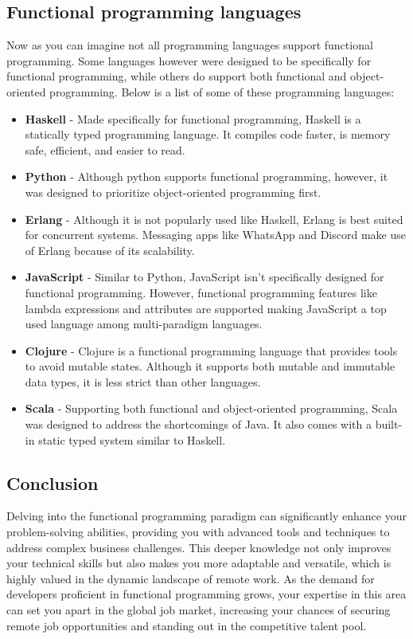 \documentclass[12pt]{article}
\begin{document}
\subsection{Functional programming languages}
Now as you can imagine not all programming languages support functional programming. Some languages however were designed to be specifically for functional programming, while others do support both functional and object-oriented programming. Below is a list of some of these programming languages:
\begin{itemize}
    \item \textbf{Haskell} - Made specifically for functional programming, Haskell is a statically typed programming language. It compiles code faster, is memory safe, efficient, and easier to read.
    \item \textbf{Python} - Although python supports functional programming, however, it was designed to prioritize object-oriented programming first.
    \item \textbf{Erlang} - Although it is not popularly used like Haskell, Erlang is best suited for concurrent systems. Messaging apps like WhatsApp and Discord make use of Erlang because of its scalability.
    \item \textbf{JavaScript} - Similar to Python, JavaScript isn't specifically designed for functional programming. However, functional programming features like lambda expressions and attributes are supported making JavaScript a top used language among multi-paradigm languages.
    \item \textbf{Clojure} - Clojure is a functional programming language that provides tools to avoid mutable states. Although it supports both mutable and immutable data types, it is less strict than other languages.
    \item \textbf{Scala} - Supporting both functional and object-oriented programming, Scala was designed to address the shortcomings of Java. It also comes with a built-in static typed system similar to Haskell.
\end{itemize}

\subsection{Conclusion}
Delving into the functional programming paradigm can significantly enhance your problem-solving abilities, providing you with advanced tools and techniques to address complex business challenges. This deeper knowledge not only improves your technical skills but also makes you more adaptable and versatile, which is highly valued in the dynamic landscape of remote work. As the demand for developers proficient in functional programming grows, your expertise in this area can set you apart in the global job market, increasing your chances of securing remote job opportunities and standing out in the competitive talent pool.\\
\end{document}
